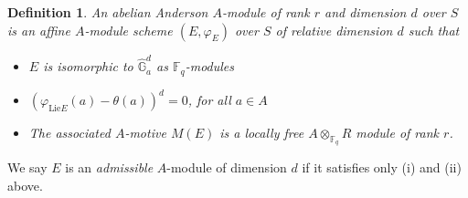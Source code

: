 \documentclass{amsart}
\newtheorem {definition}[theorem]{\bf Definition}
\numberwithin {equation}{section}
\DeclareMathOperator{\Lie}{\mathrm{Lie}}
\begin{document}
\color{black}

\begin{definition}  
\label{abAnddef}
An abelian Anderson $A$-module of rank $r$ and dimension $d$ over $S$ is an affine $A$-module scheme  $(E,\varphi_{E})$ over  $S$  of relative dimension $d$ such that 
\begin{itemize}

\item[(i)] $E$ is isomorphic to $\hat{\mathbb{G}}_{a}^{d}$ as $\mathbb{F}_{q}$-modules
\item[(ii)] $(\varphi_{\mathrm{Lie}E}(a)-\theta(a))^{d}=0$, for all $a \in A$
\item[(iii)] The associated $A$-motive $M(E)$ is a locally free $A\otimes_{\mathbb{F}_{q}}R$ module of rank $r$.
\end{itemize}
\end{definition}

We say $E$ is an \emph{admissible} $A$-module of dimension $d$ if it satisfies only (i) and (ii) above.
\end{document}
